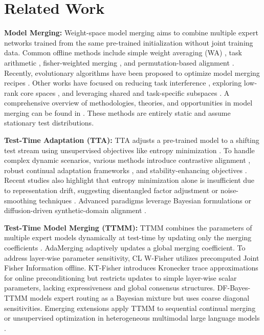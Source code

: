 \documentclass{article}
\theoremstyle{plain}
\theoremstyle{definition}
\theoremstyle{remark}
\begin{document}
\section{Related Work}
\label{sec:related_work}
\textbf{Model Merging:} Weight-space model merging aims to combine multiple expert networks trained from the same pre-trained initialization without joint training data. Common offline methods include simple weight averaging (WA) \citep{wortsman2022robust}, task arithmetic \citep{ilharco2022editing}, fisher-weighted merging \citep{matena2022merging}, and permutation-based alignment \citep{ainsworth2022git}. Recently, evolutionary algorithms have been proposed to optimize model merging recipes \citep{akiba2024evolutionary}. Other works have focused on reducing task interference \citep{gargiulo2024task, sun2025merging}, exploring low-rank core spaces \citep{panariello2025accurate}, and leveraging shared and task-specific subspaces \citep{marczak2025task}. A comprehensive overview of methodologies, theories, and opportunities in model merging can be found in \citet{yang2024model}. These methods are entirely static and assume stationary test distributions.

\textbf{Test-Time Adaptation (TTA):} TTA adjusts a pre-trained model to a shifting test stream using unsupervised objectives like entropy minimization \citep{wang2021tent, liang2023comprehensive, liang2023source}. To handle complex dynamic scenarios, various methods introduce contrastive alignment \citep{chen2022contrastive}, robust continual adaptation frameworks \citep{yuan2023robust, song2023ecotta, gong2022note}, and stability-enhancing objectives \citep{niu2023towards}. Recent studies also highlight that entropy minimization alone is insufficient due to representation drift, suggesting disentangled factor adjustment \citep{lee2024entropy} or noise-smoothing techniques \citep{guo2025smoothing}. Advanced paradigms leverage Bayesian formulations \citep{zhou2025bayesian} or diffusion-driven synthetic-domain alignment \citep{guo2025everything}.

\textbf{Test-Time Model Merging (TTMM):} TTMM combines the parameters of multiple expert models dynamically at test-time by updating only the merging coefficients \citep{yang2024adamerging, yang2025testtime}. AdaMerging \citep{yang2024adamerging} adaptively updates a global merging coefficient. To address layer-wise parameter sensitivity, CL W-Fisher \citep{yang2025testtime} utilizes precomputed Joint Fisher Information offline. KT-Fisher \citep{he2024ktfisher} introduces Kronecker trace approximations for online preconditioning but restricts updates to simple layer-wise scalar parameters, lacking expressiveness and global consensus structures. DF-Bayes-TTMM \citep{anyabest2026} models expert routing as a Bayesian mixture but uses coarse diagonal sensitivities. Emerging extensions apply TTMM to sequential continual merging \citep{tang2025merging} or unsupervised optimization in heterogeneous multimodal large language models \citep{du2025adamms}.
\end{document}

